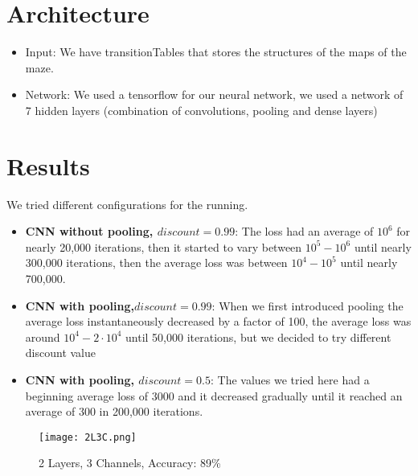 \documentclass[a4paper]{article}
\begin{document}
\section{Architecture}
\begin{itemize}
\item Input: We have transitionTables that stores the structures of the maps of the maze.

\item Network: We used a tensorflow for our neural network, we used a network of 7 hidden layers (combination of convolutions, pooling and dense layers)
\end{itemize}

\section{Results}
We tried different configurations for the running.
\begin{itemize}
\item {\bf CNN without pooling, $discount=0.99$}: The loss had an average of $10^6$ for nearly 20,000 iterations, then it started to vary between $10^5 - 10^6$ until nearly 300,000 iterations, then the average loss was between $10^4 - 10^5$ until nearly 700,000.
\item {\bf CNN with pooling,$discount=0.99$}: When we first introduced pooling the average loss instantaneously decreased by a factor of 100, the average loss was around $10^4 - 2 \cdot 10^4$ until 50,000 iterations, but we decided to try different discount value
\item {\bf CNN with pooling, $discount = 0.5$}: The values we tried here had a beginning average loss of $3000$ and it decreased gradually until it reached an average of $300$ in 200,000 iterations.

\end{itemize}



\iffalse
\begin{figure}[h]
\centerline{\texttt{[image: 2L3C.png]}}
\caption{2 Layers, 3 Channels, Accuracy: 89\%}\label{placeholder}
\end{figure}
\end{document}
